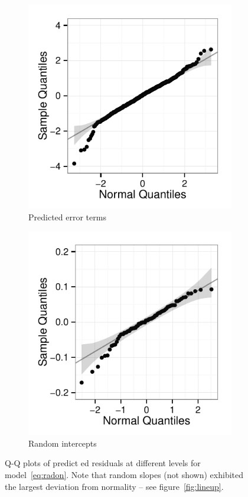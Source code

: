 \documentclass{article} %
\newcommand{\al}[1]{{\color{red} #1}}
\begin{document}
\begin{figure}[htb]
	\centering
	  \begin{subfigure}[b]{0.3\linewidth}
		\includegraphics[width=\linewidth]{raw-lev1-qq.pdf}
		\caption{Predicted error terms}
	  \end{subfigure}	
	  \begin{subfigure}[b]{0.3\linewidth}
	\includegraphics[width=\linewidth]{raw-intercept-qq.pdf}
		\caption{Random intercepts}
	  \end{subfigure}	
	\caption{\label{fig:qqplots1} Q-Q plots of predict\al{ed residuals} at different levels %
	for model~\eqref{eq:radon}. Note that random slopes (not shown) exhibited the largest deviation from normality -- see figure~\ref{fig:lineup}. }
\end{figure}
\end{document}
